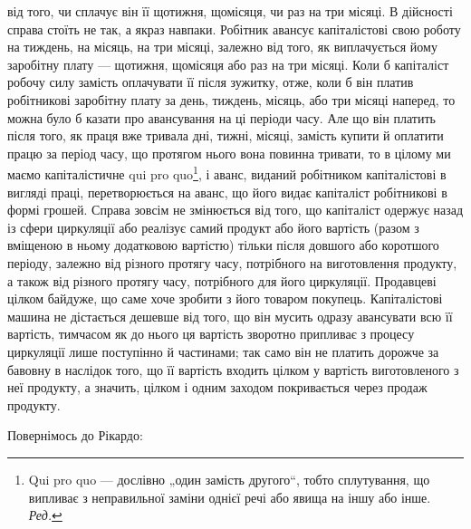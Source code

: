\parcont{}  %
від того, чи сплачує він її щотижня, щомісяця, чи раз на три місяці.
В дійсності справа стоїть не так, а якраз навпаки. Робітник авансує
капіталістові свою роботу на тиждень, на місяць, на три місяці, залежно
від того, як виплачується йому заробітну плату — щотижня, щомісяця або
раз на три місяці. Коли б капіталіст  робочу силу замість
оплачувати її після зужитку, отже, коли б він платив робітникові заробітну
плату за день, тиждень, місяць, або три місяці наперед, то можна
було б казати про авансування на ці періоди часу. Але що він платить
після того, як праця вже тривала дні, тижні, місяці, замість купити й
оплатити працю за період часу, що протягом нього вона повинна тривати,
то в цілому ми маємо капіталістичне qui pro quo\footnote*{
Qui pro quo — дослівно „один замість другого“, тобто сплутування, що
випливає з неправильної заміни однієї речі або явища на іншу або інше. \emph{Ред.}
}, і аванс, виданий
робітником капіталістові в вигляді праці, перетворюється на аванс, що
його видає капіталіст робітникові в формі грошей. Справа зовсім не змінюється
від того, що капіталіст одержує назад із сфери циркуляції або
реалізує самий продукт або його вартість (разом з вміщеною в ньому
додатковою вартістю) тільки після довшого або коротшого періоду, залежно
від різного протягу часу, потрібного на виготовлення продукту,
а також від різного протягу часу, потрібного для його циркуляції. Продавцеві
цілком байдуже, що саме хоче зробити з його товаром покупець.
Капіталістові машина не дістається дешевше від того, що він мусить
одразу авансувати всю її вартість, тимчасом як до нього ця вартість
зворотно припливає з процесу циркуляції лише поступінно й частинами;
так само він не платить дорожче за бавовну в наслідок того, що її
вартість входить цілком у вартість виготовленого з неї продукту, а
значить, цілком і одним заходом покривається через продаж продукту.

Повернімось до Рікардо:

